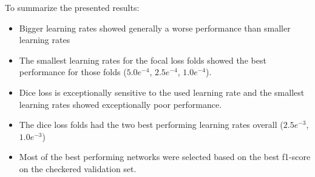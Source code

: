 To summarize the presented results:
\begin{itemize}
    \item Bigger learning rates showed generally a worse performance than smaller learning rates
    \item The smallest learning rates for the focal loss folds showed the best performance for those folds ($5.0e^{-4}$, $2.5e^{-4}$, $1.0e^{-4}$).
    \item Dice loss is exceptionally sensitive to the used learning rate and the smallest learning rates showed exceptionally poor performance.
    \item The dice loss folds had the two best performing learning rates overall ($2.5e^{-3}$, $1.0e^{-3}$)
    \item Most of the best performing networks were selected based on the best f1-score on the checkered validation set.
\end{itemize}


